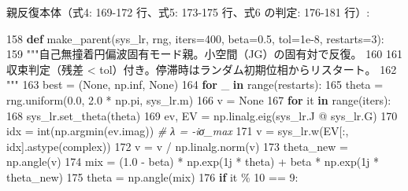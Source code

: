 \documentclass[
  a4paper,
]{ltjsarticle}
\newenvironment{Shaded}{}{}
\newcommand{\BuiltInTok}[1]{\textcolor[rgb]{0.00,0.50,0.00}{#1}}
\newcommand{\CommentTok}[1]{\textcolor[rgb]{0.38,0.63,0.69}{\textit{#1}}}
\newcommand{\ControlFlowTok}[1]{\textcolor[rgb]{0.00,0.44,0.13}{\textbf{#1}}}
\newcommand{\DecValTok}[1]{\textcolor[rgb]{0.25,0.63,0.44}{#1}}
\newcommand{\FloatTok}[1]{\textcolor[rgb]{0.25,0.63,0.44}{#1}}
\newcommand{\KeywordTok}[1]{\textcolor[rgb]{0.00,0.44,0.13}{\textbf{#1}}}
\newcommand{\NormalTok}[1]{#1}
\newcommand{\OperatorTok}[1]{\textcolor[rgb]{0.40,0.40,0.40}{#1}}
\newcommand{\OtherTok}[1]{\textcolor[rgb]{0.00,0.44,0.13}{#1}}
\newcommand{\StringTok}[1]{\textcolor[rgb]{0.25,0.44,0.63}{#1}}
\newcommand{\VariableTok}[1]{\textcolor[rgb]{0.10,0.09,0.49}{#1}}
\begin{document}
親反復本体（式4: 169-172 行、式5: 173-175 行、式6 の判定: 176-181 行）:

\begin{Shaded}
\begin{Highlighting}[]
   \DecValTok{158}  \KeywordTok{def}\NormalTok{ make\_parent(sys\_lr, rng, iters}\OperatorTok{=}\DecValTok{400}\NormalTok{, beta}\OperatorTok{=}\FloatTok{0.5}\NormalTok{, tol}\OperatorTok{=}\FloatTok{1e{-}8}\NormalTok{, restarts}\OperatorTok{=}\DecValTok{3}\NormalTok{):}
   \DecValTok{159}      \StringTok{"""自己無撞着円偏波固有モード親。小空間（JG）の固有対で反復。}
\StringTok{   160}
\StringTok{   161      収束判定（残差 \textless{} tol）付き。停滞時はランダム初期位相からリスタート。}
\StringTok{   162      """}
   \DecValTok{163}\NormalTok{      best }\OperatorTok{=}\NormalTok{ (}\VariableTok{None}\NormalTok{, np.inf, }\VariableTok{None}\NormalTok{)}
   \DecValTok{164}      \ControlFlowTok{for}\NormalTok{ \_ }\KeywordTok{in} \BuiltInTok{range}\NormalTok{(restarts):}
   \DecValTok{165}\NormalTok{          theta }\OperatorTok{=}\NormalTok{ rng.uniform(}\FloatTok{0.0}\NormalTok{, }\FloatTok{2.0} \OperatorTok{*}\NormalTok{ np.pi, sys\_lr.m)}
   \DecValTok{166}\NormalTok{          v }\OperatorTok{=} \VariableTok{None}
   \DecValTok{167}          \ControlFlowTok{for}\NormalTok{ it }\KeywordTok{in} \BuiltInTok{range}\NormalTok{(iters):}
   \DecValTok{168}\NormalTok{              sys\_lr.set\_theta(theta)}
   \DecValTok{169}\NormalTok{              ev, EV }\OperatorTok{=}\NormalTok{ np.linalg.eig(sys\_lr.J }\OperatorTok{@}\NormalTok{ sys\_lr.G)}
   \DecValTok{170}\NormalTok{              idx }\OperatorTok{=} \BuiltInTok{int}\NormalTok{(np.argmin(ev.imag))  }\CommentTok{\# λ = {-}iσ\_max}
   \DecValTok{171}\NormalTok{              v }\OperatorTok{=}\NormalTok{ sys\_lr.w(EV[:, idx].astype(}\BuiltInTok{complex}\NormalTok{))}
   \DecValTok{172}\NormalTok{              v }\OperatorTok{=}\NormalTok{ v }\OperatorTok{/}\NormalTok{ np.linalg.norm(v)}
   \DecValTok{173}\NormalTok{              theta\_new }\OperatorTok{=}\NormalTok{ np.angle(v)}
   \DecValTok{174}\NormalTok{              mix }\OperatorTok{=}\NormalTok{ (}\FloatTok{1.0} \OperatorTok{{-}}\NormalTok{ beta) }\OperatorTok{*}\NormalTok{ np.exp(}\OtherTok{1j} \OperatorTok{*}\NormalTok{ theta) }\OperatorTok{+}\NormalTok{ beta }\OperatorTok{*}\NormalTok{ np.exp(}\OtherTok{1j} \OperatorTok{*}\NormalTok{ theta\_new)}
   \DecValTok{175}\NormalTok{              theta }\OperatorTok{=}\NormalTok{ np.angle(mix)}
   \DecValTok{176}              \ControlFlowTok{if}\NormalTok{ it }\OperatorTok{\%} \DecValTok{10} \OperatorTok{==} \DecValTok{9}\NormalTok{:}

\end{Highlighting}
\end{Shaded}
\end{document}
